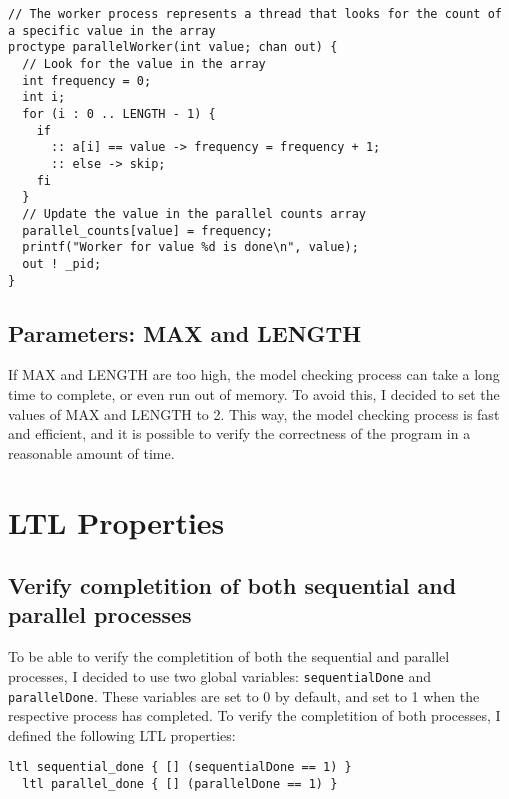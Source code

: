 \documentclass[a4paper, 11pt]{article}
\begin{document}
\begin{lstlisting}[language=Promela, caption={ProMeLa parallel frequency counter - worker process}, captionpos=b, breaklines=true, label={lst:promela_parallel_worker}]
// The worker process represents a thread that looks for the count of a specific value in the array
proctype parallelWorker(int value; chan out) {
  // Look for the value in the array
  int frequency = 0;
  int i;
  for (i : 0 .. LENGTH - 1) {
    if
      :: a[i] == value -> frequency = frequency + 1;
      :: else -> skip;
    fi
  }
  // Update the value in the parallel counts array
  parallel_counts[value] = frequency;
  printf("Worker for value %d is done\n", value);
  out ! _pid;
}
\end{lstlisting}


\subsection{Parameters: MAX and LENGTH}

If MAX and LENGTH are too high, the model checking process can take a long time to complete, or even run out of memory. To avoid this, I decided to set the values of MAX and LENGTH to 2. This way, the model checking process is fast and efficient, and it is possible to verify the correctness of the program in a reasonable amount of time.

\pagebreak

\section{LTL Properties}
\label{sec:ltl_properties}

\subsection{Verify completition of both sequential and parallel processes}

To be able to verify the completition of both the sequential and parallel processes, I decided to use two global variables: \texttt{sequentialDone} and \texttt{parallelDone}. These variables are set to 0 by default, and set to 1 when the respective process has completed. To verify the completition of both processes, I defined the following LTL properties:

\begin{lstlisting}[language=Promela, caption={LTL properties to verify the completition of both sequential and parallel processes}, captionpos=b, breaklines=true, label={lst:ltl_properties}]
  ltl sequential_done { [] (sequentialDone == 1) }
  ltl parallel_done { [] (parallelDone == 1) }
\end{lstlisting}
\end{document}
